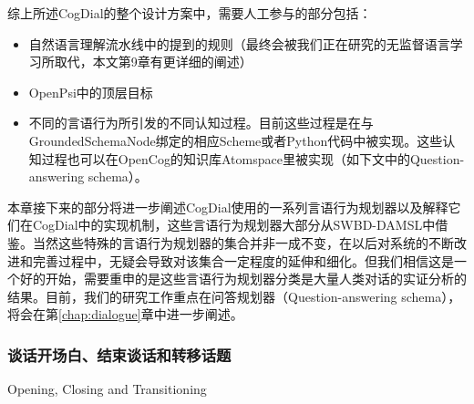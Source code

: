 综上所述CogDial的整个设计方案中，需要人工参与的部分包括：
\begin{itemize}
\item 自然语言理解流水线中的提到的规则（最终会被我们正在研究的无监督语言学习所取代，本文第9章有更详细的阐述）
\item OpenPsi中的顶层目标
\item 不同的言语行为所引发的不同认知过程。目前这些过程是在与GroundedSchemaNode绑定的相应Scheme或者Python代码中被实现。这些认知过程也可以在OpenCog的知识库Atomspace里被实现（如下文中的Question-answering schema）。
\end{itemize}
本章接下来的部分将进一步阐述CogDial使用的一系列言语行为规划器以及解释它们在CogDial中的实现机制，这些言语行为规划器大部分从SWBD-DAMSL中借鉴。当然这些特殊的言语行为规划器的集合并非一成不变，在以后对系统的不断改进和完善过程中，无疑会导致对该集合一定程度的延伸和细化。但我们相信这是一个好的开始，需要重申的是这些言语行为规划器分类是大量人类对话的实证分析的结果。目前，我们的研究工作重点在问答规划器（Question-answering schema），将会在第\ref{chap:dialogue}章中进一步阐述。

\subsubsection{谈话开场白、结束谈话和转移话题}{Opening, Closing and Transitioning}

